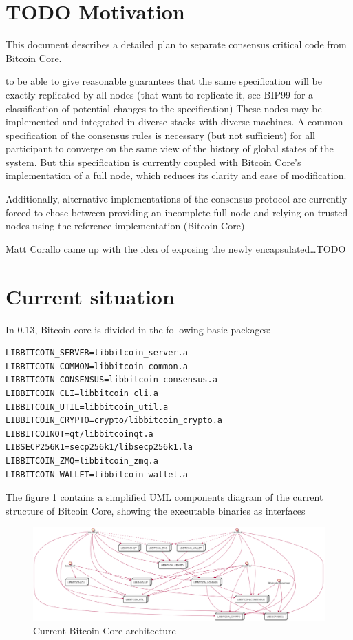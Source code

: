 \documentclass[11pt]{article}
\begin{document}
\newpage
\section{{\bfseries\sffamily TODO} Motivation}
\label{sec-1}

This document describes a detailed plan to separate consensus critical code from Bitcoin Core.


 to be able to give
reasonable guarantees that the same specification will be exactly
replicated by all nodes (that want to replicate it, see BIP99 for a
classification of potential changes to the specification) These nodes
may be implemented and integrated in diverse stacks with diverse machines.
A common specification of the consensus rules is necessary (but not
sufficient) for all participant to converge on the same view of the
history of global states of the system. But this specification is
currently coupled with Bitcoin Core's implementation of a full node,
which reduces its clarity and ease of modification.

Additionally, alternative implementations of the consensus protocol
are currently forced to chose between providing an incomplete full
node and relying on trusted nodes using the reference implementation
(Bitcoin Core)

Matt Corallo came up with the idea of exposing the newly encapsulated\ldots{}TODO

\newpage
\section{Current situation}
\label{sec-2}

In 0.13, Bitcoin core is divided in the following basic packages:

\begin{verbatim}
LIBBITCOIN_SERVER=libbitcoin_server.a
LIBBITCOIN_COMMON=libbitcoin_common.a
LIBBITCOIN_CONSENSUS=libbitcoin_consensus.a
LIBBITCOIN_CLI=libbitcoin_cli.a
LIBBITCOIN_UTIL=libbitcoin_util.a
LIBBITCOIN_CRYPTO=crypto/libbitcoin_crypto.a
LIBBITCOINQT=qt/libbitcoinqt.a
LIBSECP256K1=secp256k1/libsecp256k1.la
LIBBITCOIN_ZMQ=libbitcoin_zmq.a
LIBBITCOIN_WALLET=libbitcoin_wallet.a
\end{verbatim}

The figure \ref{pic_1_current} contains a simplified UML components diagram of
the current structure of Bitcoin Core, showing the executable
binaries as interfaces 

\begin{figure}[htb]
\centering
\includegraphics[width=.9\linewidth]{./img/1_current.png}
\caption{\label{pic_1_current}Current Bitcoin Core architecture}
\end{figure}
\end{document}
